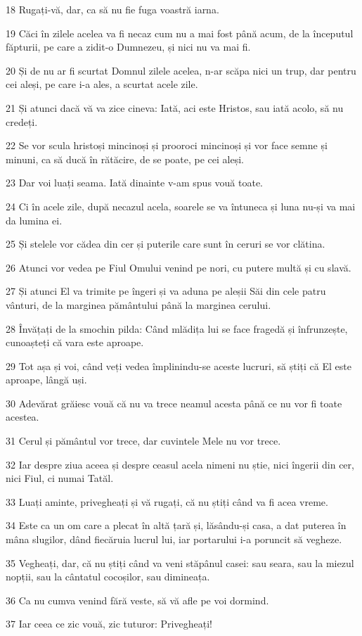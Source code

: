 \par 18 Rugați-vă, dar, ca să nu fie fuga voastră iarna.
\par 19 Căci în zilele acelea va fi necaz cum nu a mai fost până acum, de la începutul făpturii, pe care a zidit-o Dumnezeu, și nici nu va mai fi.
\par 20 Și de nu ar fi scurtat Domnul zilele acelea, n-ar scăpa nici un trup, dar pentru cei aleși, pe care i-a ales, a scurtat acele zile.
\par 21 Și atunci dacă vă va zice cineva: Iată, aci este Hristos, sau iată acolo, să nu credeți.
\par 22 Se vor scula hristoși mincinoși și prooroci mincinoși și vor face semne și minuni, ca să ducă în rătăcire, de se poate, pe cei aleși.
\par 23 Dar voi luați seama. Iată dinainte v-am spus vouă toate.
\par 24 Ci în acele zile, după necazul acela, soarele se va întuneca și luna nu-și va mai da lumina ei.
\par 25 Și stelele vor cădea din cer și puterile care sunt în ceruri se vor clătina.
\par 26 Atunci vor vedea pe Fiul Omului venind pe nori, cu putere multă și cu slavă.
\par 27 Și atunci El va trimite pe îngeri și va aduna pe aleșii Săi din cele patru vânturi, de la marginea pământului până la marginea cerului.
\par 28 Învățați de la smochin pilda: Când mlădița lui se face fragedă și înfrunzește, cunoașteți că vara este aproape.
\par 29 Tot așa și voi, când veți vedea împlinindu-se aceste lucruri, să știți că El este aproape, lângă uși.
\par 30 Adevărat grăiesc vouă că nu va trece neamul acesta până ce nu vor fi toate acestea.
\par 31 Cerul și pământul vor trece, dar cuvintele Mele nu vor trece.
\par 32 Iar despre ziua aceea și despre ceasul acela nimeni nu știe, nici îngerii din cer, nici Fiul, ci numai Tatăl.
\par 33 Luați aminte, privegheați și vă rugați, că nu știți când va fi acea vreme.
\par 34 Este ca un om care a plecat în altă țară și, lăsându-și casa, a dat puterea în mâna slugilor, dând fiecăruia lucrul lui, iar portarului i-a poruncit să vegheze.
\par 35 Vegheați, dar, că nu știți când va veni stăpânul casei: sau seara, sau la miezul nopții, sau la cântatul cocoșilor, sau dimineața.
\par 36 Ca nu cumva venind fără veste, să vă afle pe voi dormind.
\par 37 Iar ceea ce zic vouă, zic tuturor: Privegheați!

